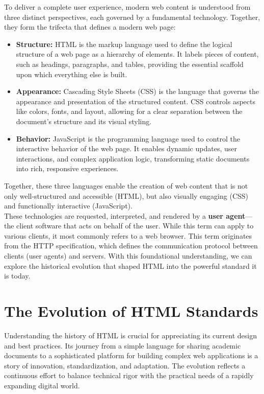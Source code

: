\documentclass{scrbook}
\begin{document}
To deliver a complete user experience, modern web content is understood from three distinct perspectives, each governed by a fundamental technology. Together, they form the trifecta that defines a modern web page: \\

\begin{itemize}
    \item
    \textbf{Structure:} HTML is the markup language used to define the logical structure of a web page as a hierarchy of elements. It labels pieces of content, such as headings, paragraphs, and tables, providing the essential scaffold upon which everything else is built.
    
    \item
    \textbf{Appearance:} Cascading Style Sheets (CSS) is the language that governs the appearance and presentation of the structured content. CSS controls aspects like colors, fonts, and layout, allowing for a clear separation between the document's structure and its visual styling.
    
    \item 
    \textbf{Behavior:} JavaScript is the programming language used to control the interactive behavior of the web page. It enables dynamic updates, user interactions, and complex application logic, transforming static documents into rich, responsive experiences.
\end{itemize}

Together, these three languages enable the creation of web content that is not only well-structured and accessible (HTML), but also visually engaging (CSS) and functionally interactive (JavaScript). \\

These technologies are requested, interpreted, and rendered by a \textbf{user agent}—the client software that acts on behalf of the user. While this term can apply to various clients, it most commonly refers to a web browser. This term originates from the HTTP specification, which defines the communication protocol between clients (user agents) and servers. With this foundational understanding, we can explore the historical evolution that shaped HTML into the powerful standard it is today.

\chapter{The Evolution of HTML Standards}

Understanding the history of HTML is crucial for appreciating its current design and best practices. Its journey from a simple language for sharing academic documents to a sophisticated platform for building complex web applications is a story of innovation, standardization, and adaptation. The evolution reflects a continuous effort to balance technical rigor with the practical needs of a rapidly expanding digital world. \\
\end{document}

